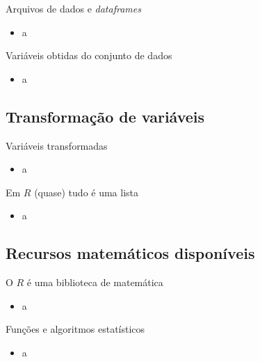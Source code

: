 \documentclass[a4paper,10pt]{beamer}
\begin{document}
\begin{frame}{Arquivos de dados e {\em dataframes}}
    \begin{itemize}
	\item a
    \end{itemize}

\end{frame}

\begin{frame}{Variáveis obtidas do conjunto de dados}
    \begin{itemize}
	\item a
    \end{itemize}

\end{frame}

\subsection{Transformação de variáveis}

\begin{frame}{Variáveis transformadas}
    \begin{itemize}
	\item a
    \end{itemize}

\end{frame}

\begin{frame}{Em $R$ (quase) tudo é uma lista}
    \begin{itemize}
	\item a
    \end{itemize}

\end{frame}

\subsection{Recursos matemáticos disponíveis}

\begin{frame}{O $R$ é uma biblioteca de matemática}
    \begin{itemize}
	\item a
    \end{itemize}

\end{frame}

\begin{frame}{Funções e algoritmos estatísticos}
    \begin{itemize}
	\item a
    \end{itemize}

\end{frame}
\end{document}
